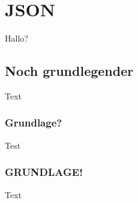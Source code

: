 \section{JSON}
\label{sec:json}

Hallo?

\subsection{Noch grundlegender}
Text

\subsubsection{Grundlage?}
Test

\subsubsection{GRUNDLAGE!}
Text